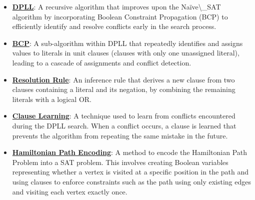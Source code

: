 \documentclass{article}%
\begin{document}
\begin{itemize}[leftmargin=*]
\item \href{https://purdue.brightspace.com/d2l/common/assets/pdfjs-d2l-dist/1.0.14-legacy/web/viewer.html?file=\%2Fcontent\%2Fenforced\%2F1095467-wl.202510.CS.24300.001\%2F15L2-SAT.pdf\%3Fou\%3D1095467\&lang=en-us\&container=d2l-fileviewer-rendered-pdf\&fullscreen=d2l-fileviewer-rendered-pdf-dialog\&height=667#page=17}{\textbf{DPLL}}: A recursive algorithm that improves upon the Naïve\textbackslash{}_SAT algorithm by incorporating Boolean Constraint Propagation (BCP) to efficiently identify and resolve conflicts early in the search process.%
\item \href{https://purdue.brightspace.com/d2l/common/assets/pdfjs-d2l-dist/1.0.14-legacy/web/viewer.html?file=\%2Fcontent\%2Fenforced\%2F1095467-wl.202510.CS.24300.001\%2F15L2-SAT.pdf\%3Fou\%3D1095467\&lang=en-us\&container=d2l-fileviewer-rendered-pdf\&fullscreen=d2l-fileviewer-rendered-pdf-dialog\&height=667#page=20}{\textbf{BCP}}: A sub-algorithm within DPLL that repeatedly identifies and assigns values to literals in unit clauses (clauses with only one unassigned literal), leading to a cascade of assignments and conflict detection.%
\item \href{https://purdue.brightspace.com/d2l/common/assets/pdfjs-d2l-dist/1.0.14-legacy/web/viewer.html?file=\%2Fcontent\%2Fenforced\%2F1095467-wl.202510.CS.24300.001\%2F15L2-SAT.pdf\%3Fou\%3D1095467\&lang=en-us\&container=d2l-fileviewer-rendered-pdf\&fullscreen=d2l-fileviewer-rendered-pdf-dialog\&height=667#page=32}{\textbf{Resolution Rule}}: An inference rule that derives a new clause from two clauses containing a literal and its negation, by combining the remaining literals with a logical OR.%
\item \href{https://purdue.brightspace.com/d2l/common/assets/pdfjs-d2l-dist/1.0.14-legacy/web/viewer.html?file=\%2Fcontent\%2Fenforced\%2F1095467-wl.202510.CS.24300.001\%2F15L2-SAT.pdf\%3Fou\%3D1095467\&lang=en-us\&container=d2l-fileviewer-rendered-pdf\&fullscreen=d2l-fileviewer-rendered-pdf-dialog\&height=667#page=35}{\textbf{Clause Learning}}: A technique used to learn from conflicts encountered during the DPLL search. When a conflict occurs, a clause is learned that prevents the algorithm from repeating the same mistake in the future.%
\item \href{https://purdue.brightspace.com/d2l/common/assets/pdfjs-d2l-dist/1.0.14-legacy/web/viewer.html?file=\%2Fcontent\%2Fenforced\%2F1095467-wl.202510.CS.24300.001\%2F15L2-SAT.pdf\%3Fou\%3D1095467\&lang=en-us\&container=d2l-fileviewer-rendered-pdf\&fullscreen=d2l-fileviewer-rendered-pdf-dialog\&height=667#page=40}{\textbf{Hamiltonian Path Encoding}}: A method to encode the Hamiltonian Path Problem into a SAT problem. This involves creating Boolean variables representing whether a vertex is visited at a specific position in the path and using clauses to enforce constraints such as the path using only existing edges and visiting each vertex exactly once.%

\end{itemize}
\end{document}
